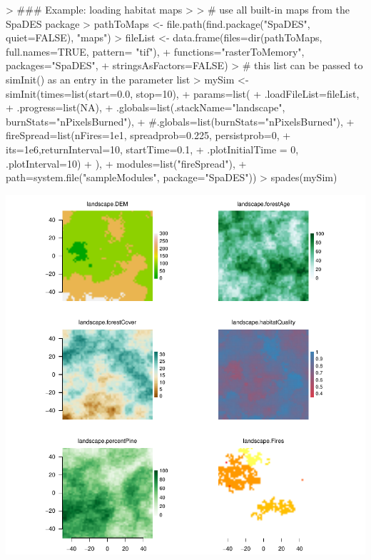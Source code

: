\documentclass{article}
\begin{document}
\begin{Schunk}
\begin{Sinput}
> ### Example: loading habitat maps
> 
> # use all built-in maps from the SpaDES package
> pathToMaps <- file.path(find.package("SpaDES", quiet=FALSE), "maps")
> fileList <- data.frame(files=dir(pathToMaps, full.names=TRUE, pattern= "tif"),
+                       functions="rasterToMemory", packages="SpaDES",
+                       stringsAsFactors=FALSE)
> # this list can be passed to simInit() as an entry in the parameter list
> mySim <- simInit(times=list(start=0.0, stop=10),
+                  params=list(
+                    .loadFileList=fileList,
+                    .progress=list(NA),
+                    .globals=list(.stackName="landscape", burnStats="nPixelsBurned"),
+                    #.globals=list(burnStats="nPixelsBurned"),
+                    fireSpread=list(nFires=1e1, spreadprob=0.225, persistprob=0,
+                                    its=1e6,returnInterval=10, startTime=0.1,
+                                    .plotInitialTime = 0, .plotInterval=10)
+                  ),
+                  modules=list("fireSpread"),
+                  path=system.file("sampleModules", package="SpaDES"))
> spades(mySim)
\end{Sinput}
\end{Schunk}
\includegraphics{introduction-load-landscape-maps}
\end{document}
